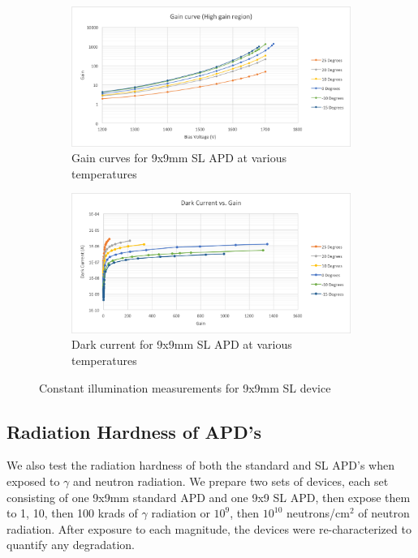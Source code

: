 \begin{figure}
  \centering
  \begin{subfigure}[h]{0.9\linewidth}
    \includegraphics[width=\linewidth]{Figures/SLGainCurves.png}
    \caption{Gain curves for 9x9mm SL APD at various temperatures}
  \end{subfigure}

  \begin{subfigure}[h]{0.9\linewidth}
    \includegraphics[width=\linewidth]{Figures/SLDarkCurrentVsGain.png}
    \caption{Dark current for 9x9mm SL APD at various temperatures}
  \end{subfigure}
  \label{fig:slconst}
  \caption{Constant illumination measurements for 9x9mm SL device}
\end{figure}

\subsection{Radiation Hardness of APD's}

We also test the radiation hardness of both the standard and SL APD's when exposed to $\gamma$ and neutron radiation.  We prepare two sets of devices, each set consisting of one 9x9mm standard APD and one 9x9 SL APD, then expose them to 1, 10, then 100 krads of $\gamma$ radiation or $10^9$, then $10^{10}$ neutrons/cm$^2$ of neutron radiation.  After exposure to each magnitude, the devices were re-characterized to quantify any degradation.  

